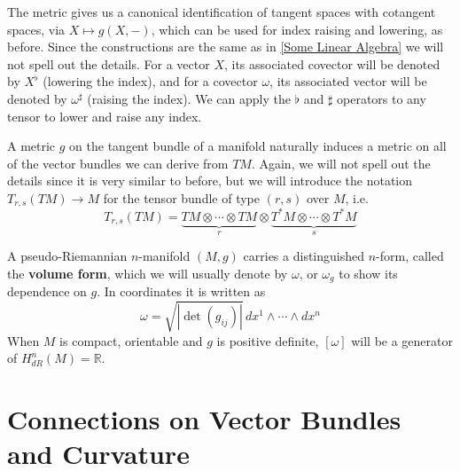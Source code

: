 The metric gives us a canonical identification of tangent spaces with cotangent spaces, via $X \mapsto g(X,-)$, which can be used for index raising and lowering, as before. Since the constructions are the same as in \cref{Some Linear Algebra} we will not spell out the details. For a vector $X$, its associated covector will be denoted by $X^\flat$ (lowering the index), and for a covector $\omega$, its associated vector will be denoted by $\omega^\sharp$ (raising the index). We can apply the $\flat$ and $\sharp$ operators to any tensor to lower and raise any index.

A metric $g$ on the tangent bundle of a manifold naturally induces a metric on all of the vector bundles we can derive from $TM$. Again, we will not spell out the details since it is very similar to before, but we will introduce the notation $T_{r,s}(TM) \rightarrow M$ for the tensor bundle of type $(r,s)$ over $M$, i.e. 
\[ T_{r,s}(TM) = \underbrace{TM \otimes \cdots \otimes TM}_{r} \otimes \underbrace{T^*M \otimes \cdots \otimes T^*M}_{s}  \]

A pseudo-Riemannian $n$-manifold $(M,g)$ carries a distinguished $n$-form, called the \textbf{volume form}, which we will usually denote by $\omega$, or $\omega_g$ to show its dependence on $g$. In coordinates it is written as
\[ \omega = \sqrt{|\det (g_{ij})|} \, dx^1 \wedge \cdots \wedge dx^n \]
When $M$ is compact, orientable and $g$ is positive definite, $[\omega]$ will be a generator of $H_{dR}^n(M) = \mathbb R$. 





















\section{Connections on Vector Bundles and Curvature}

